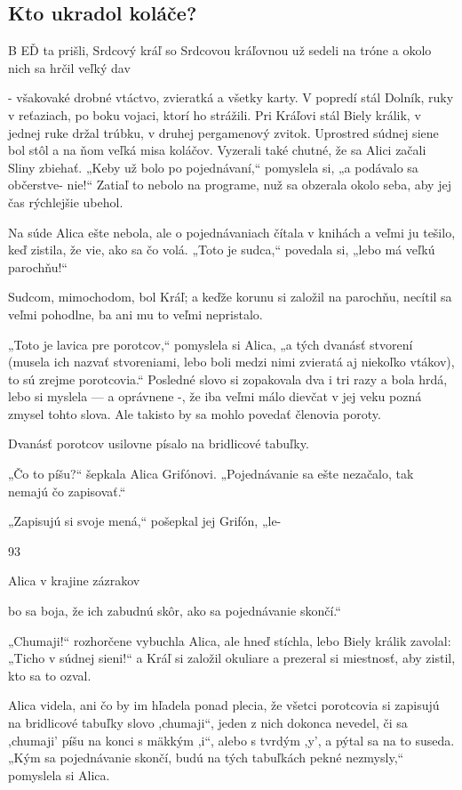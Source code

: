 \documentclass[12pt]{article}
\begin{document}
\begin{Parallel}[p]{}{}
{{%
\section{Kto ukradol koláče?}

B EĎ ta prišli, Srdcový kráľ so Srdcovou kráľovnou
už sedeli na tróne a okolo nich sa hrčil veľký dav

- všakovaké drobné vtáctvo, zvieratká a všetky karty.
V popredí stál Dolník, ruky v reťaziach, po boku vojaci,
ktorí ho strážili. Pri Kráľovi stál Biely králik, v jednej ruke
držal trúbku, v druhej pergamenový zvitok. Uprostred
súdnej siene bol stôl a na ňom veľká misa koláčov. Vyzerali
také chutné, že sa Alici začali Sliny zbiehať. „Keby už bolo
po pojednávaní,“ pomyslela si, „a podávalo sa občerstve-
nie!“ Zatiaľ to nebolo na programe, nuž sa obzerala okolo
seba, aby jej čas rýchlejšie ubehol.

Na súde Alica ešte nebola, ale o pojednávaniach čítala
v knihách a veľmi ju tešilo, keď zistila, že vie, ako sa čo volá.
„Toto je sudca,“ povedala si, „lebo má veľkú parochňu!“

Sudcom, mimochodom, bol Kráľ; a keďže korunu si
založil na parochňu, necítil sa veľmi pohodlne, ba ani mu to
veľmi nepristalo.

„Toto je lavica pre porotcov,“ pomyslela si Alica, „a tých
dvanásť stvorení (musela ich nazvať stvoreniami, lebo boli
medzi nimi zvieratá aj niekoľko vtákov), to sú zrejme
porotcovia.“ Posledné slovo si zopakovala dva i tri razy
a bola hrdá, lebo si myslela — a oprávnene -, že iba veľmi
málo dievčat v jej veku pozná zmysel tohto slova. Ale takisto
by sa mohlo povedať členovia poroty.

Dvanásť porotcov usilovne písalo na bridlicové tabuľky.

„Čo to píšu?“ šepkala Alica Grifónovi. „Pojednávanie
sa ešte nezačalo, tak nemajú čo zapisovať.“

„Zapisujú si svoje mená,“ pošepkal jej Grifón, „le-

93

Alica v krajine zázrakov

bo sa boja, že ich zabudnú skôr, ako sa pojednávanie
skončí.“

„Chumaji!“ rozhorčene vybuchla Alica, ale hneď stíchla,
lebo Biely králik zavolal: „Ticho v súdnej sieni!“ a Kráľ si
založil okuliare a prezeral si miestnosť, aby zistil, kto sa to
ozval.

Alica videla, ani čo by im hľadela ponad plecia, že všetci
porotcovia si zapisujú na bridlicové tabuľky slovo ,chumaji“,
jeden z nich dokonca nevedel, či sa ,chumaji' píšu na konci
s mäkkým ,i“, alebo s tvrdým ,y', a pýtal sa na to suseda.
„Kým sa pojednávanie skončí, budú na tých tabuľkách
pekné nezmysly,“ pomyslela si Alica.

}}
\end{Parallel}
\end{document}
